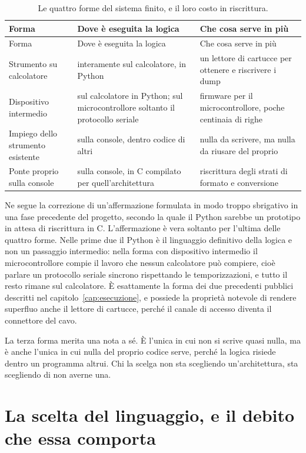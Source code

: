 \begin{longtable}{@{}p{3.4cm}p{5.4cm}p{5.4cm}@{}}
\caption{Le quattro forme del sistema finito, e il loro costo in riscrittura.}\label{tab:forme}\\
\toprule
Forma & Dove è eseguita la logica & Che cosa serve in più \\
\midrule
\endfirsthead
\toprule
Forma & Dove è eseguita la logica & Che cosa serve in più \\
\midrule
\endhead
Strumento su calcolatore & interamente sul calcolatore, in Python & un lettore di cartucce per ottenere e riscrivere i dump \\
Dispositivo intermedio & sul calcolatore in Python; sul microcontrollore soltanto il protocollo seriale & firmware per il microcontrollore, poche centinaia di righe \\
Impiego dello strumento esistente & sulla console, dentro codice di altri & nulla da scrivere, ma nulla da riusare del proprio \\
Ponte proprio sulla console & sulla console, in C compilato per quell'architettura & riscrittura degli strati di formato e conversione \\
\bottomrule
\end{longtable}

Ne segue la correzione di un'affermazione formulata in modo troppo sbrigativo in una fase precedente del progetto, secondo la quale il Python sarebbe un prototipo in attesa di riscrittura in C. L'affermazione è vera soltanto per l'ultima delle quattro forme. Nelle prime due il Python è il linguaggio definitivo della logica e non un passaggio intermedio: nella forma con dispositivo intermedio il microcontrollore compie il lavoro che nessun calcolatore può compiere, cioè parlare un protocollo seriale sincrono rispettando le temporizzazioni, e tutto il resto rimane sul calcolatore. È esattamente la forma dei due precedenti pubblici descritti nel capitolo~\ref{cap:esecuzione}, e possiede la proprietà notevole di rendere superfluo anche il lettore di cartucce, perché il canale di accesso diventa il connettore del cavo.

La terza forma merita una nota a sé. È l'unica in cui non si scrive quasi nulla, ma è anche l'unica in cui nulla del proprio codice serve, perché la logica risiede dentro un programma altrui. Chi la scelga non sta scegliendo un'architettura, sta scegliendo di non averne una.

\section{La scelta del linguaggio, e il debito che essa comporta}

